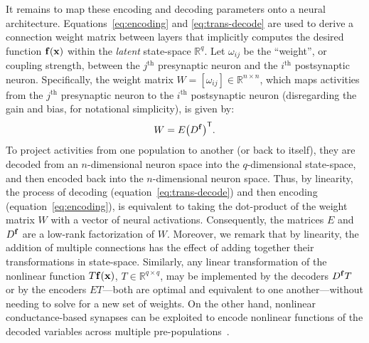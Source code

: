 It remains to map these encoding and decoding parameters onto a neural architecture.
Equations~\ref{eq:encoding} and \ref{eq:trans-decode} are used to derive a connection weight matrix between layers that implicitly computes the desired function $\mathbf{f}(\mathbf{x})$ within the \emph{latent} state-space $\mathbb{R}^q$.
Let $\omega_{ij}$ be the ``weight'', or coupling strength, between the $j^\text{th}$ presynaptic neuron and the $i^\text{th}$ postsynaptic neuron.
Specifically, the weight matrix $W = [\omega_{ij}] \in \mathbb{R}^{n \times n}$, which maps activities from the $j^{\text{th}}$ presynaptic neuron to the $i^{\text{th}}$ postsynaptic neuron (disregarding the gain and bias, for notational simplicity), is given by:
\begin{equation} \label{eq:factored-weights}
W = E {\left(D^{\mathbf{f}}\right)}^\mathsf{T} \text{.}
\end{equation}
To project activities from one population to another (or back to itself), they are decoded from an $n$-dimensional neuron space into the $q$-dimensional state-space, and then encoded back into the $n$-dimensional neuron space.
Thus, by linearity, the process of decoding (equation~\ref{eq:trans-decode}) and then encoding (equation~\ref{eq:encoding}), is equivalent to taking the dot-product of the weight matrix $W$ with a vector of neural activations.
Consequently, the matrices $E$ and $D^{\mathbf{f}}$ are a low-rank factorization of $W$.
Moreover, we remark that by linearity, the addition of multiple connections has the effect of adding together their transformations in state-space. Similarly, any linear transformation of the nonlinear function $T\mathbf{f}(\mathbf{x})$, $T \in \mathbb{R}^{q \times q}$, may be implemented by the decoders $D^{\mathbf{f}}T$ or by the encoders $ET$---both are optimal and equivalent to one another---without needing to solve for a new set of weights.
On the other hand, nonlinear conductance-based synapses can be exploited to encode nonlinear functions of the decoded variables across multiple pre-populations~\citep{stoeckel2018}.

